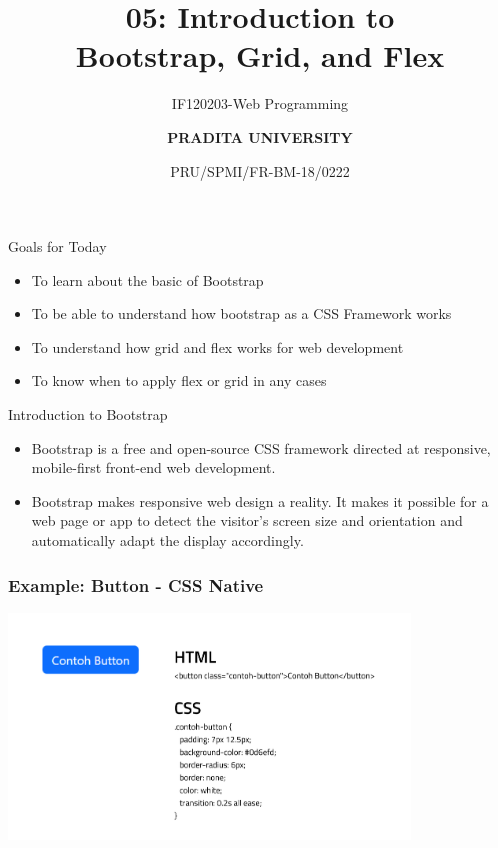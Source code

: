 \documentclass[aspectratio=169, table]{beamer}
\subtitle{IF120203-Web Programming}
\title{\huge {\textbf{05: Introduction to\\Bootstrap, Grid, and Flex}}}
\date[Serial]{\scriptsize {PRU/SPMI/FR-BM-18/0222}}
\author[Pradita]{\small {\textbf{PRADITA UNIVERSITY}}}
\begin{document}
\begin{frame}
    \titlepage
\end{frame}

\begin{frame}{Goals for Today}
    \vskip-1cm
    \begin{itemize}
        \item To learn about the basic of Bootstrap
        \item To be able to understand how bootstrap as a CSS Framework works
        \item To understand how grid and flex works for web development
        \item To know when to apply flex or grid in any cases
    \end{itemize}
\end{frame}

\begin{frame}{Introduction to Bootstrap}
    \vskip-0cm
    \begin{itemize}
        \item Bootstrap is a free and open-source CSS framework directed at responsive, mobile-first front-end web development.
        \item Bootstrap makes responsive web design a reality. It makes it possible for a web page or app to detect the visitor's screen size and orientation and automatically adapt the display accordingly.
    \end{itemize}
\end{frame}

\begin{frame}[fragile]
	\frametitle{Example: Button - CSS Native}
	\vskip1cm
	\begin{center}
		\includegraphics[width=0.8\textwidth]{classFiles/button-css-native.png}
	\end{center}
\end{frame}
\end{document}
